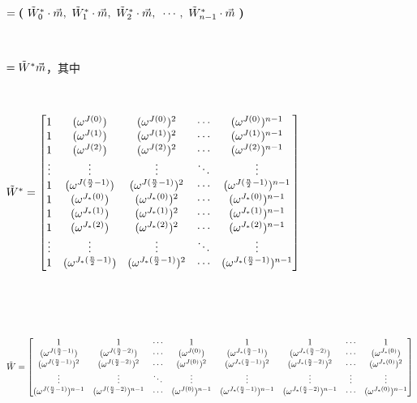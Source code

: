 $ $

$= \bm{(} \text{ } \tilde{W}^*_0\cdot \vec{m}, \text{ } \tilde{W}^*_1\cdot \vec{m}, \text{ } \tilde{W}^*_2\cdot \vec{m}, \text{ } \cdots, \text{ } \tilde{W}^*_{n-1}\cdot \vec{m} \text{ } \bm{)} $ 

$ $

$ = \tilde{W}^* \vec{m} $，其中

$ $

\noindent $\tilde{W}^* = \begin{bmatrix}
1 & (\omega^{J(0)}) & (\omega^{J(0)})^2 & \cdots & (\omega^{J(0)})^{n-1}\\
1 & (\omega^{J(1)}) & (\omega^{J(1)})^2 & \cdots & (\omega^{J(1)})^{n-1}\\
1 & (\omega^{J(2)}) & (\omega^{J(2)})^2 & \cdots & (\omega^{J(2)})^{n-1}\\
\vdots & \vdots & \vdots & \ddots & \vdots \\
1 & (\omega^{J(\frac{n}{2}-1)}) & (\omega^{J(\frac{n}{2}-1)})^2 & \cdots & (\omega^{J(\frac{n}{2}-1)})^{n-1}\\
1 & (\omega^{J_*(0)}) & (\omega^{J_*(0)})^2 & \cdots & (\omega^{J_*(0)})^{n-1}\\
1 & (\omega^{J_*(1)}) & (\omega^{J_*(1)})^2 & \cdots & (\omega^{J_*(1)})^{n-1}\\
1 & (\omega^{J_*(2)}) & (\omega^{J_*(2)})^2 & \cdots & (\omega^{J_*(2)})^{n-1}\\
\vdots & \vdots & \vdots & \ddots & \vdots \\
1 & (\omega^{J_*(\frac{n}{2}-1)}) & (\omega^{J_*(\frac{n}{2}-1)})^2 & \cdots & (\omega^{J_*(\frac{n}{2}-1)})^{n-1}\\
\end{bmatrix}$

$ $

$ $

\noindent $\tilde{W} = \begin{bmatrix}
1 & 1 & \cdots & 1 & 1 & 1 & \cdots & 1\\
(\omega^{J(\frac{n}{2} - 1)}) & (\omega^{J(\frac{n}{2} - 2)}) & \cdots & (\omega^{J(0)}) & (\omega^{J_*(\frac{n}{2} - 1)}) & (\omega^{J_*(\frac{n}{2} - 2)}) & \cdots & (\omega^{J_*(0)})\\
(\omega^{J(\frac{n}{2} - 1)})^2 & (\omega^{J(\frac{n}{2} - 2)})^2 & \cdots & (\omega^{J(0)})^2 & (\omega^{J_*(\frac{n}{2} - 1)})^2 & (\omega^{J_*(\frac{n}{2} - 2)})^2 & \cdots & (\omega^{J_*(0)})^2 \\
\vdots & \vdots & \ddots & \vdots & \vdots & \vdots & \vdots & \vdots \\
(\omega^{J(\frac{n}{2} - 1)})^{n-1} & (\omega^{J(\frac{n}{2} - 2)})^{n-1} & \cdots & (\omega^{J(0)})^{n-1} & (\omega^{J_*(\frac{n}{2} - 1)})^{n-1} & (\omega^{J_*(\frac{n}{2} - 2)})^{n-1} & \cdots  & (\omega^{J_*(0)})^{n-1}
\end{bmatrix}$

